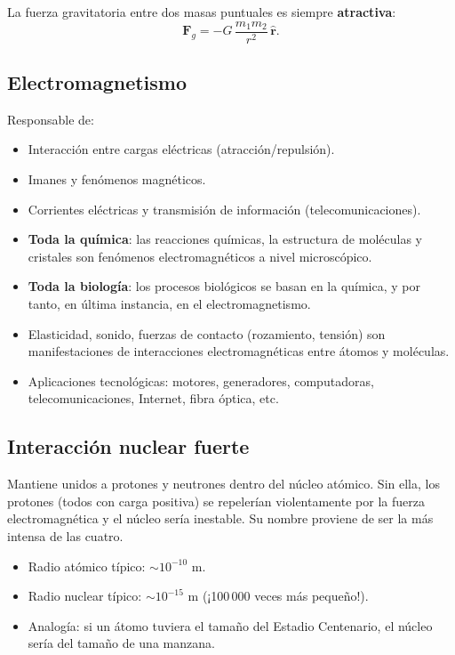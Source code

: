 \documentclass[12pt,a4paper]{article}
\begin{document}
La fuerza gravitatoria entre dos masas puntuales es siempre \textbf{atractiva}:
\[
\mathbf{F}_g = -G\,\frac{m_1 m_2}{r^2}\,\hat{\mathbf{r}}.
\]

\subsection{Electromagnetismo}

Responsable de:
\begin{itemize}[nosep]
  \item Interacción entre cargas eléctricas (atracción/repulsión).
  \item Imanes y fenómenos magnéticos.
  \item Corrientes eléctricas y transmisión de información (telecomunicaciones).
  \item \textbf{Toda la química}: las reacciones químicas, la estructura de moléculas y cristales son fenómenos electromagnéticos a nivel microscópico.
  \item \textbf{Toda la biología}: los procesos biológicos se basan en la química, y por tanto, en última instancia, en el electromagnetismo.
  \item Elasticidad, sonido, fuerzas de contacto (rozamiento, tensión) son manifestaciones de interacciones electromagnéticas entre átomos y moléculas.
  \item Aplicaciones tecnológicas: motores, generadores, computadoras, telecomunicaciones, Internet, fibra óptica, etc.
\end{itemize}

\subsection{Interacción nuclear fuerte}

Mantiene unidos a protones y neutrones dentro del núcleo atómico. Sin ella, los protones (todos con carga positiva) se repelerían violentamente por la fuerza electromagnética y el núcleo sería inestable. Su nombre proviene de ser la más intensa de las cuatro.

\begin{notebox}
\begin{itemize}[nosep]
  \item Radio atómico típico: $\sim 10^{-10}$ m.
  \item Radio nuclear típico: $\sim 10^{-15}$ m (¡100\,000 veces más pequeño!).
  \item Analogía: si un átomo tuviera el tamaño del Estadio Centenario, el núcleo sería del tamaño de una manzana.
\end{itemize}
\end{notebox}
\end{document}
